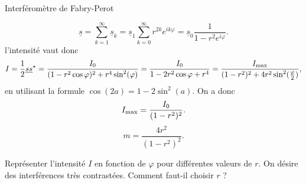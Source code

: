 \begin{exo}[1][TD]{Interféromètre de Fabry-Perot}
\begin{questions}
{    $$\underline{s} = \sum_{k=1}^{\infty} \underline{s}_k = \underline{s}_1 \sum_{k=0}^{\infty} r^{2k} e^{i k \varphi} = \underline{s}_0\frac{1}{1-r^2e^{i\varphi}}.$$
    l’intensité vaut donc 
    $$
  I = \frac{1}{2} \underline{s} \underline{s}^\star = \frac{I_0}{(1-r^2\cos\varphi)^2 + r^4 \sin^2(\varphi) } = \frac{I_0}{1 - 2r^2\cos\varphi + r^4} = \frac{I_{\rm max}}{(1-r^2)^2 + 4r^2 \sin^2(\frac{\varphi}{2})},
    $$
    en utilisant la formule $\cos(2a) = 1-2\sin^2(a)$. On a donc
    $$
    I_{\rm max} = \frac{I_0}{(1-r^2)^2}.
    $$ 
    $$\boxed{
      m = \frac{4r^2}{(1-r^2)^2}.
    }$$}
  \item Représenter l'intensité $I$ en fonction de $\varphi$ pour différentes valeurs de $r$. On désire des interférences très contrastées. Comment faut-il choisir $r$ ?
  \end{questions}
  \end{exo}
  